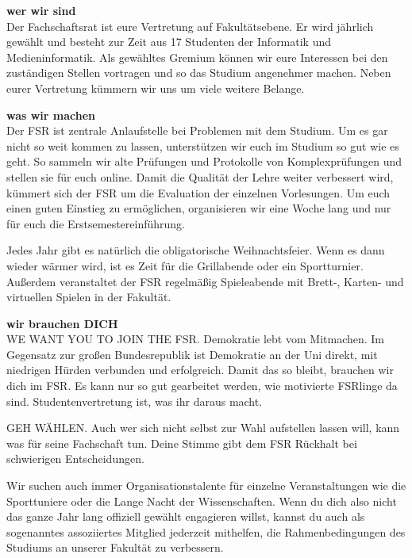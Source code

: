 
\textbf{wer wir sind} \\
Der Fachschaftsrat ist eure Vertretung auf Fakultätsebene.
Er wird jährlich gewählt und besteht zur Zeit aus 17 Studenten der Informatik und Medieninformatik.
Als gewähltes Gremium können wir eure Interessen bei den zuständigen Stellen vortragen und so das Studium angenehmer machen.
Neben eurer Vertretung kümmern wir uns um viele weitere Belange.

\textbf{was wir machen} \\
Der FSR ist zentrale Anlaufstelle bei Problemen mit dem Studium.
Um es gar nicht so weit kommen zu lassen, unterstützen wir euch im Studium so gut wie es geht.
So sammeln wir alte Prüfungen und Protokolle von Komplexprüfungen und stellen sie für euch online.
Damit die Qualität der Lehre weiter verbessert wird, kümmert sich der FSR um die Evaluation der einzelnen Vorlesungen.
Um euch einen guten Einstieg zu ermöglichen, organisieren wir eine Woche lang und nur für euch die Erstsemestereinführung.

Jedes Jahr gibt es natürlich die obligatorische Weihnachtsfeier.
Wenn es dann wieder wärmer wird, ist es Zeit für die Grillabende oder ein Sportturnier. \\
Außerdem veranstaltet der FSR regelmäßig Spieleabende mit Brett-, Karten- und virtuellen Spielen in der Fakultät.

\textbf{wir brauchen DICH} \\
WE WANT YOU TO JOIN THE FSR.
Demokratie lebt vom Mitmachen.
Im Gegensatz zur großen Bundesrepublik ist Demokratie an der Uni direkt, mit niedrigen Hürden verbunden und erfolgreich.
Damit das so bleibt, brauchen wir dich im FSR.
Es kann nur so gut gearbeitet werden, wie motivierte FSRlinge da sind.
Studentenvertretung ist, was ihr daraus macht.

GEH WÄHLEN.
Auch wer sich nicht selbst zur Wahl aufstellen lassen will, kann was für seine Fachschaft tun.
Deine Stimme gibt dem FSR Rückhalt bei schwierigen Entscheidungen.


Wir suchen auch immer Organisationstalente für einzelne Veranstaltungen wie die Sporttuniere oder die Lange Nacht der Wissenschaften.
Wenn du dich also nicht das ganze Jahr lang offiziell gewählt engagieren willst, kannst du auch als sogenanntes assoziiertes Mitglied jederzeit mithelfen, die Rahmenbedingungen des Studiums an unserer Fakultät zu verbessern.

